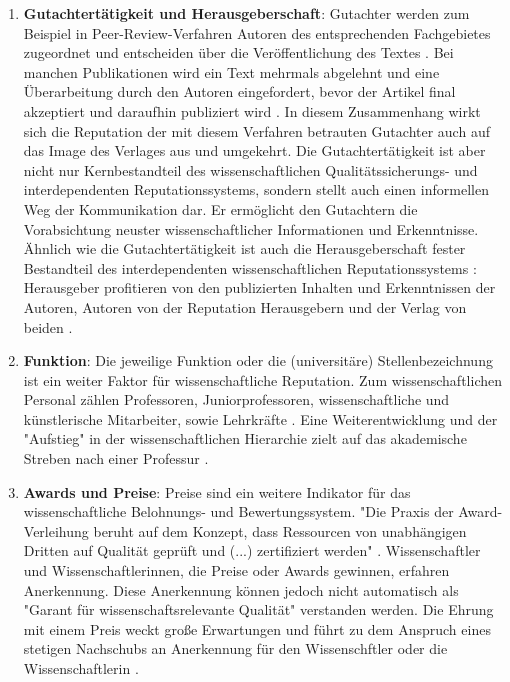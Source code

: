 \begin{enumerate}
\begin{end}
\begin{enumerate}
\item \textbf{Gutachtertätigkeit und Herausgeberschaft}: Gutachter werden zum Beispiel in Peer-Review-Verfahren Autoren des entsprechenden Fachgebietes zugeordnet und entscheiden über die Veröffentlichung des Textes \cite{Frey_2005}. Bei manchen Publikationen wird ein Text mehrmals abgelehnt und eine Überarbeitung durch den Autoren eingefordert, bevor der Artikel final akzeptiert und daraufhin publiziert wird \cite{Frey_2005}. In diesem Zusammenhang wirkt sich die Reputation der mit diesem Verfahren betrauten Gutachter auch auf das Image des Verlages aus und umgekehrt. Die Gutachtertätigkeit ist aber nicht nur Kernbestandteil des wissenschaftlichen Qualitätssicherungs- und interdependenten Reputationssystems, sondern stellt auch einen informellen Weg der Kommunikation dar. Er ermöglicht den Gutachtern die Vorabsichtung neuster wissenschaftlicher Informationen und Erkenntnisse. Ähnlich wie die Gutachtertätigkeit ist auch die Herausgeberschaft fester Bestandteil des interdependenten wissenschaftlichen Reputationssystems \cite{Frey_2005}: Herausgeber profitieren von den publizierten Inhalten und Erkenntnissen der Autoren, Autoren von der Reputation Herausgebern und der Verlag von beiden \cite{suchen}.
\item \textbf{Funktion}: Die jeweilige Funktion oder die (universitäre) Stellenbezeichnung ist ein weiter Faktor für wissenschaftliche Reputation. Zum wissenschaftlichen Personal zählen Professoren, Juniorprofessoren, wissenschaftliche und künstlerische Mitarbeiter, sowie Lehrkräfte \cite{erhardt_2011_hochschulen}. Eine Weiterentwicklung und der "Aufstieg" in der wissenschaftlichen Hierarchie zielt auf das akademische Streben nach einer Professur \cite{Klecha_2008}.
\item \textbf{Awards und Preise}: Preise sind ein weitere Indikator für das wissenschaftliche Belohnungs- und Bewertungssystem. "Die Praxis der Award-Verleihung beruht auf dem Konzept, dass Ressourcen von unabhängigen Dritten auf Qualität geprüft und (...) zertifiziert werden" \cite{bargheer_2002_qualitatskriterien}. Wissenschaftler und Wissenschaftlerinnen, die Preise oder Awards gewinnen, erfahren Anerkennung. Diese Anerkennung können jedoch nicht automatisch als "Garant für wissenschaftsrelevante Qualität"\cite{bargheer_2002_qualitatskriterien} verstanden werden. Die Ehrung mit einem Preis weckt große Erwartungen und führt zu dem Anspruch eines stetigen Nachschubs an Anerkennung für den Wissenschftler oder die Wissenschaftlerin \cite{suchen}.
\end{enumerate}


\end{end}
\end{enumerate}
